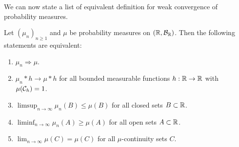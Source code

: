 \pagebreak

We can now state a list of equivalent definition for weak convergence of probability measures.

\begin{theorem}\label{thm:portmanteau}
Let $(\mu_n)_{n \ge 1}$ and $\mu$ be probability measures on $(\mathbb R, \mathcal B_{\mathbb R})$. Then the following statements are equivalent:
\begin{enumerate}
\item $\mu_n \Rightarrow \mu$.
\item $\mu_n \ast h \to \mu \ast h$ for all bounded measurable functions $h: \mathbb R \to \mathbb R$ with $\mu(\mathcal C_h) = 1$.
\item $\limsup_{n \to \infty} \mu_n(B) \le \mu(B)$ for all closed sets $B \subset \mathbb R$.
\item $\liminf_{n \to \infty} \mu_n(A) \ge \mu(A)$ for all open sets $A \subset \mathbb R$.
\item $\lim_{n \to \infty} \mu(C) = \mu(C)$ for all $\mu$-continuity sets $C$.
\end{enumerate}
\end{theorem} 

